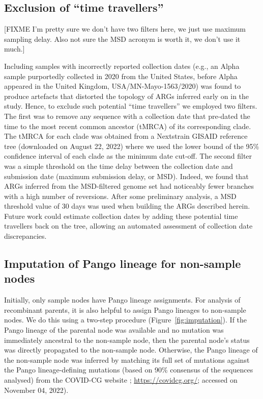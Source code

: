 \documentclass{article}
\begin{document}
\subsection{Exclusion of ``time travellers''}
[FIXME I'm pretty sure we don't have two filters here, we just use
maximum sampling delay. Also not sure the MSD acronym is worth it,
we don't use it much.]

Including samples with incorrectly reported collection dates (e.g., an Alpha
sample purportedly collected in 2020 from the United States, before Alpha
appeared in the United Kingdom, USA/MN-Mayo-1563/2020) was found to produce
artefacts that distorted the topology of ARGs inferred early on in the study.
Hence, to exclude such potential ``time travellers'' we employed two filters.
The first was to remove any sequence with a collection date that pre-dated the
time to the most recent common ancestor (tMRCA) of its corresponding clade. The
tMRCA for each clade was obtained from a Nextstrain GISAID reference tree
(downloaded on August 22, 2022) where we used the lower bound of the 95\%
confidence interval of each clade as the minimum date cut-off. The second
filter was a simple threshold on the time delay between the collection date and
submission date (maximum submission delay, or MSD). Indeed, we found that ARGs
inferred from the MSD-filtered genome set had noticeably fewer branches with a
high number of reversions. After some preliminary analysis, a MSD threshold
value of 30 days was used when building the ARGs described herein. Future work
could estimate collection dates by adding these potential time travellers back
on the tree, allowing an automated assessment of collection date discrepancies.

\subsection{Imputation of Pango lineage for non-sample nodes}
Initially, only sample nodes have Pango lineage assignments.
For analysis of recombinant parents, it is also helpful to assign
Pango lineages to non-sample nodes. We do this
using a two-step procedure (Figure~\ref{fig:imputation}). If the Pango
lineage of the parental node was available and no mutation was immediately
ancestral to the non-sample node, then the parental node’s status was directly
propagated to the non-sample node. Otherwise, the Pango lineage of the
non-sample node was inferred by matching its full set of mutations against the
Pango lineage-defining mutations (based on 90\% consensus of the sequences
analysed) from the COVID-CG website \citep{Chen2021-zc};
\url{https://covidcg.org/}; accessed on November 04, 2022).
\end{document}
